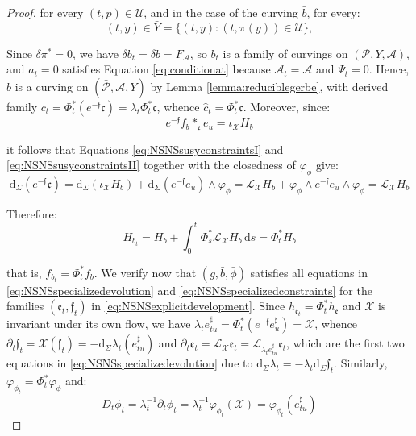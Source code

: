 \documentclass[10pt,reqno,a4paper]{amsart}
\theoremstyle{plain}
\theoremstyle{definition}
\theoremstyle{remark}
\theoremstyle{remark}
\def\dd{\mathrm{d}}
\def\cA{\mathcal{A}}
\def\cP{\mathcal{P}}
\def\cL{\mathcal{L}}
\def\cX{\mathcal{X}}
\def\frc{\mathfrak{c}}
\def\cL{\mathcal{L}}
\def\cU{\mathcal{U}}
\def\fre{\mathfrak{e}}
\renewcommand{\(}{ (}
\renewcommand{\)}{ )}
\newcommand{\frf}{\mathfrak{f}}
\begin{document}
\begin{proof}
\noindent
for every $(t,p)\in \cU$, and in the case of the curving $\bar{b}$, for every:
\begin{equation*}
(t,y)\in \bar{Y}=\{(t,y):(t,\pi(y))\in\mathcal U\},
\end{equation*}

\noindent
Since $\delta\pi^{\ast} = 0$, we have $\delta b_t = \delta b = F_{\cA}$, so $b_t$ is a family of curvings on $(\cP,Y,\cA)$, and $a_t = 0$ satisfies Equation \eqref{eq:conditionat} because $\cA_t = \cA$ and $\Psi_t = 0$. Hence, $\bar{b}$ is a curving on $(\bar{\cP},\bar{\cA},\bar{Y})$ by Lemma \ref{lemma:reduciblegerbe}, with derived family $c_t = \Phi_t^{\ast}(e^{-\frf}\frc) = \lambda_t \Phi_t^{\ast}\frc$, whence $\widehat{c}_t = \Phi_t^{\ast}\frc$. Moreover, since:
\begin{equation*}
e^{-\frf} f_b \ast_{\fre} e_u = \iota_{\cX} H_b    
\end{equation*}

\noindent
it follows that Equations \eqref{eq:NSNSsusyconstraintsI} and \eqref{eq:NSNSsusyconstraintsII} together with the closedness of $\varphi_{\phi}$ give:
\begin{equation*}
\dd_{\Sigma}(e^{-\frf}\frc) = \dd_{\Sigma}(\iota_{\cX}H_b) + \dd_{\Sigma}(e^{-\frf}e_u)\wedge\varphi_{\phi} = \cL_{\cX}H_b + \varphi_{\phi}\wedge e^{-\frf}e_u\wedge\varphi_{\phi} = \cL_{\cX}H_b
\end{equation*}

\noindent
Therefore:
\begin{equation*}
H_{b_t} = H_b + \int_0^t \Phi_s^{\ast}\cL_{\cX}H_b\, \dd s = \Phi_t^{\ast}H_b    
\end{equation*}

\noindent
that is, $f_{b_t} = \Phi_t^{\ast}f_b$. We verify now that $(g,\bar{b},\bar{\phi})$ satisfies all equations in \eqref{eq:NSNSspecializedevolution} and \eqref{eq:NSNSspecializedconstraints} for the families $(\fre_t,\frf_t)$ in \eqref{eq:NSNSexplicitdevelopment}. Since $h_{\fre_t} = \Phi_t^{\ast}h_{\fre}$ and $\cX$ is invariant under its own flow, we have $\lambda_t e^{\sharp}_{tu} = \Phi_t^{\ast}(e^{-\frf}e^{\sharp}_u) = \cX$, whence $\partial_t \frf_t = \cX(\frf_t) = -\dd_{\Sigma}\lambda_t(e^{\sharp}_{tu})$ and $\partial_t\fre_t = \cL_{\cX}\fre_t = \cL_{\lambda_t e^{\sharp}_{tu}}\fre_t$, which are the first two equations in \eqref{eq:NSNSspecializedevolution} due to $\dd_{\Sigma}\lambda_t = -\lambda_t\dd_{\Sigma}\frf_t$. Similarly, $\varphi_{\phi_t} = \Phi_t^{\ast}\varphi_{\phi}$ and:
\begin{equation*}
D_t\phi_t = \lambda_t^{-1}\partial_t\phi_t = \lambda_t^{-1}\varphi_{\phi_t}(\cX) = \varphi_{\phi_t}(e^{\sharp}_{tu})    
\end{equation*}


\end{proof}
\end{document}
